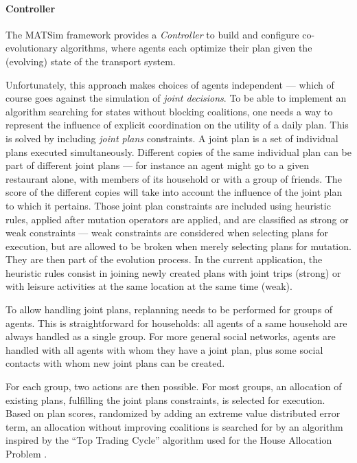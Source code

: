 {\paragraph{Controller}

The MATSim framework provides a \emph{Controller} to build and configure
co-evolutionary algorithms, where agents each optimize their plan given
the (evolving) state of the transport system.

Unfortunately, this approach makes choices of agents independent ---
which of course goes against the simulation of \emph{joint decisions}.
To be able to implement an algorithm searching for states without
blocking coalitions, one needs a way to represent the influence of
explicit coordination on the utility of a daily plan. This is solved by
including \emph{joint plans} constraints. A joint plan is a set of
individual plans executed simultaneously. Different copies of the same
individual plan can be part of different joint plans --- for instance an
agent might go to a given restaurant alone, with members of its
household or with a group of friends. The score of the different copies
will take into account the influence of the joint plan to which it
pertains. Those joint plan constraints are included using heuristic
rules, applied after mutation operators are applied, and are classified
as strong or weak constraints --- weak constraints are considered when
selecting plans for execution, but are allowed to be broken when merely
selecting plans for mutation. They are then part of the evolution
process. In the current application, the heuristic rules consist in
joining newly created plans with joint trips (strong) or with leisure
activities at the same location at the same time (weak).

To allow handling joint plans, replanning needs to be performed for
groups of agents. This is straightforward for households: all agents of
a same household are always handled as a single group. For more general
social networks, agents are handled with all agents with whom they have
a joint plan, plus some social contacts with whom new joint plans can be
created.

For each group, two actions are then possible. For most groups, an
allocation of existing plans, fulfilling the joint plans constraints, is
selected for execution. Based on plan scores, randomized by adding an
extreme value distributed error term, an allocation without improving
coalitions is searched for by an algorithm inspired by the ``Top Trading
Cycle'' algorithm used for the House Allocation Problem
\cite{SchummerVohra_NisanEtAl_2007}.

}
